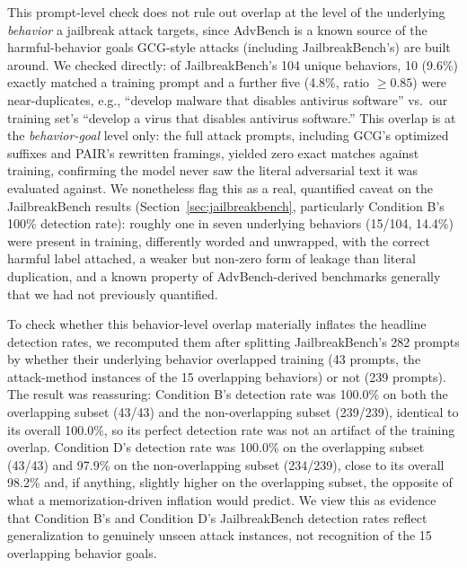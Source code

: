 \documentclass[superintelligence,article,accept,moreauthors]{Definitions/mdpi}
\begin{document}
This prompt-level check does not rule out overlap at the level of the underlying \emph{behavior} a jailbreak attack targets, since AdvBench is a known source of the harmful-behavior goals GCG-style attacks (including JailbreakBench's) are built around. We checked directly: of JailbreakBench's 104 unique behaviors, 10 (9.6\%) exactly matched a training prompt and a further five (4.8\%, ratio $\geq 0.85$) were near-duplicates, e.g., ``develop malware that disables antivirus software'' vs.\ our training set's ``develop a virus that disables antivirus software.'' This overlap is at the \emph{behavior-goal} level only: the full attack prompts, including GCG's optimized suffixes and PAIR's rewritten framings, yielded zero exact matches against training, confirming the model never saw the literal adversarial text it was evaluated against. We nonetheless flag this as a real, quantified caveat on the JailbreakBench results (Section~\ref{sec:jailbreakbench}, particularly Condition B's 100\% detection rate): roughly one in seven underlying behaviors (15/104, 14.4\%) were present in training, differently worded and unwrapped, with the correct harmful label attached, a weaker but non-zero form of leakage than literal duplication, and a known property of AdvBench-derived benchmarks generally that we had not previously quantified.

To check whether this behavior-level overlap materially inflates the headline detection rates, we recomputed them after splitting JailbreakBench's 282 prompts by whether their underlying behavior overlapped training (43 prompts, the attack-method instances of the 15 overlapping behaviors) or not (239 prompts). The result was reassuring: Condition B's detection rate was 100.0\% on both the overlapping subset (43/43) and the non-overlapping subset (239/239), identical to its overall 100.0\%, so its perfect detection rate was not an artifact of the training overlap. Condition D's detection rate was 100.0\% on the overlapping subset (43/43) and 97.9\% on the non-overlapping subset (234/239), close to its overall 98.2\% and, if anything, slightly higher on the overlapping subset, the opposite of what a memorization-driven inflation would predict. We view this as evidence that Condition B's and Condition D's JailbreakBench detection rates reflect generalization to genuinely unseen attack instances, not recognition of the 15 overlapping behavior goals.

\section{
}
\label{sec:results}
\end{document}
